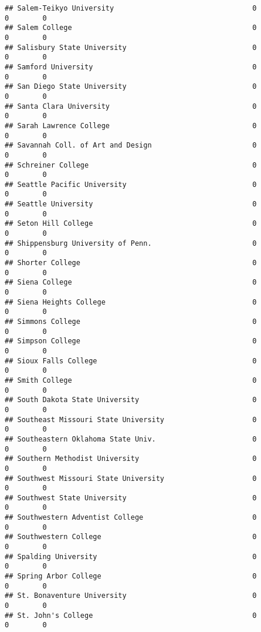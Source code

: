 \documentclass[
]{article}
\begin{document}
\begin{verbatim}
## Salem-Teikyo University                                 0           0        0
## Salem College                                           0           0        0
## Salisbury State University                              0           0        0
## Samford University                                      0           0        0
## San Diego State University                              0           0        0
## Santa Clara University                                  0           0        0
## Sarah Lawrence College                                  0           0        0
## Savannah Coll. of Art and Design                        0           0        0
## Schreiner College                                       0           0        0
## Seattle Pacific University                              0           0        0
## Seattle University                                      0           0        0
## Seton Hill College                                      0           0        0
## Shippensburg University of Penn.                        0           0        0
## Shorter College                                         0           0        0
## Siena College                                           0           0        0
## Siena Heights College                                   0           0        0
## Simmons College                                         0           0        0
## Simpson College                                         0           0        0
## Sioux Falls College                                     0           0        0
## Smith College                                           0           0        0
## South Dakota State University                           0           0        0
## Southeast Missouri State University                     0           0        0
## Southeastern Oklahoma State Univ.                       0           0        0
## Southern Methodist University                           0           0        0
## Southwest Missouri State University                     0           0        0
## Southwest State University                              0           0        0
## Southwestern Adventist College                          0           0        0
## Southwestern College                                    0           0        0
## Spalding University                                     0           0        0
## Spring Arbor College                                    0           0        0
## St. Bonaventure University                              0           0        0
## St. John's College                                      0           0        0

\end{verbatim}
\end{document}
